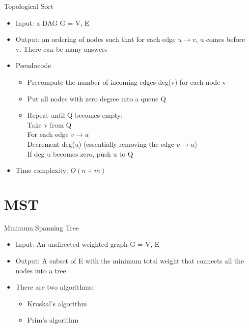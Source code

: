 \documentclass{beamer}
\begin{document}
\begin{frame}[<+->]{Topological Sort}
\begin{block}{}
  \begin{itemize}
    \item Input: a DAG G = V, E
    \item Output: an ordering of nodes such that for each edge $u \rightarrow v$, u comes before v. There can be many answers
    \item Pseudocode\\
      \begin{itemize} 
	\item Precompute the number of incoming edges deg(v) for each node v
	\item Put all nodes with zero degree into a queue Q
	\item Repeat until Q becomes empty:\\
	  \hspace{3mm} Take v from Q\\
	  \hspace{3mm} For each edge $v \rightarrow u$\\
	    \hspace{6mm} Decrement deg(u) (essentially removing the edge $v \rightarrow u$)\\
	    \hspace{6mm} If deg u becomes zero, push u to Q
	\end{itemize}
    \item Time complexity: $O(n+m)$
  \end{itemize}
\end{block}
\end{frame}

\section{MST}
\begin{frame}[<+->]{Minimum Spanning Tree}
\begin{block}{}
  \begin{itemize}
    \item Input: An undirected weighted graph G = V, E
    \item Output: A subset of E with the minimum total weight that connects all the nodes into a tree
    \item There are two algorithms:
      \begin{itemize}
	\item Kruskal's algorithm
	\item Prim's algorithm
      \end{itemize}
  \end{itemize}
\end{block}
\end{frame}
\end{document}
